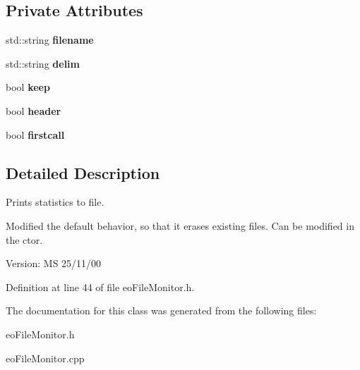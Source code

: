 \subsection*{Private Attributes}
\begin{CompactItemize}
\item 
std::string {\bf filename}\label{classeo_file_monitor_r0}

\item 
std::string {\bf delim}\label{classeo_file_monitor_r1}

\item 
bool {\bf keep}\label{classeo_file_monitor_r2}

\item 
bool {\bf header}\label{classeo_file_monitor_r3}

\item 
bool {\bf firstcall}\label{classeo_file_monitor_r4}

\end{CompactItemize}


\subsection{Detailed Description}
Prints statistics to file. 

Modified the default behavior, so that it erases existing files. Can be modified in the ctor.

\begin{Desc}
\item[Version:]MS 25/11/00 \end{Desc}




Definition at line 44 of file eo\-File\-Monitor.h.

The documentation for this class was generated from the following files:\begin{CompactItemize}
\item 
eo\-File\-Monitor.h\item 
eo\-File\-Monitor.cpp\end{CompactItemize}
